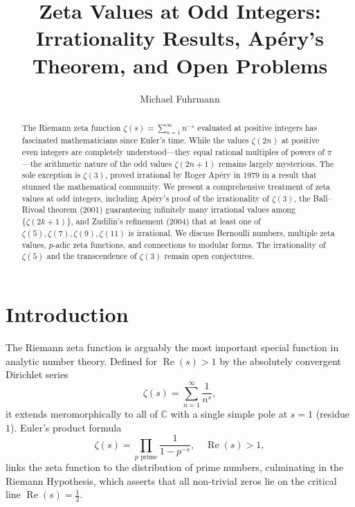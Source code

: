 \documentclass[12pt,a4paper]{amsart}
\author{Michael Fuhrmann}
\theoremstyle{definition}
\theoremstyle{remark}
\begin{document}
\title{Zeta Values at Odd Integers:\\
Irrationality Results, Apéry's Theorem, and Open Problems}

\begin{abstract}
The Riemann zeta function $\zeta(s) = \sum_{n=1}^{\infty} n^{-s}$ evaluated at
positive integers has fascinated mathematicians since Euler's time. While the
values $\zeta(2n)$ at positive even integers are completely understood---they
equal rational multiples of powers of $\pi$---the arithmetic nature of the odd
values $\zeta(2n+1)$ remains largely mysterious. The sole exception is $\zeta(3)$,
proved irrational by Roger Apéry in 1979 in a result that stunned the mathematical
community. We present a comprehensive treatment of zeta values at odd integers,
including Apéry's proof of the irrationality of $\zeta(3)$, the Ball--Rivoal theorem
(2001) guaranteeing infinitely many irrational values among $\{\zeta(2k+1)\}$,
and Zudilin's refinement (2004) that at least one of $\zeta(5), \zeta(7), \zeta(9),
\zeta(11)$ is irrational. We discuss Bernoulli numbers, multiple zeta values,
$p$-adic zeta functions, and connections to modular forms. The irrationality of
$\zeta(5)$ and the transcendence of $\zeta(3)$ remain open conjectures.
\end{abstract}

\maketitle

\tableofcontents

\section{Introduction}

The Riemann zeta function is arguably the most important special function in
analytic number theory. Defined for $\operatorname{Re}(s) > 1$ by the absolutely
convergent Dirichlet series
\[
  \zeta(s) = \sum_{n=1}^{\infty} \frac{1}{n^s},
\]
it extends meromorphically to all of $\mathbb{C}$ with a single simple pole at
$s = 1$ (residue~$1$). Euler's product formula
\[
  \zeta(s) = \prod_{p \text{ prime}} \frac{1}{1 - p^{-s}}, \quad
  \operatorname{Re}(s) > 1,
\]
links the zeta function to the distribution of prime numbers, culminating in the
Riemann Hypothesis, which asserts that all non-trivial zeros lie on the critical
line $\operatorname{Re}(s) = \tfrac{1}{2}$.
\end{document}

